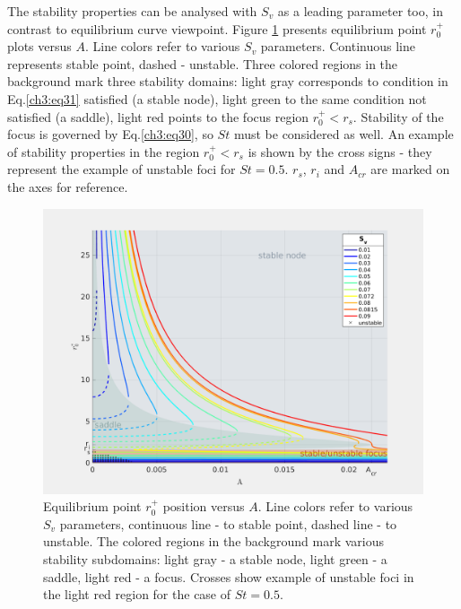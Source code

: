 \documentclass[../main.tex]{subfiles}
\begin{document}
The stability properties can be analysed with $S_v$ as a leading parameter too, in contrast to equilibrium curve viewpoint. Figure \ref{fig:ch3_8} presents equilibrium point $r^+_0$ plots versus $A$. Line colors refer to various $S_v$ parameters. Continuous line represents stable point, dashed - unstable. Three colored regions in the background mark three stability domains: light gray corresponds to condition in Eq.\ref{ch3:eq31} satisfied (a stable node), light green to the same condition not satisfied (a saddle), light red points to the focus region $r^+_0<r_s$. Stability of the focus is governed by Eq.\ref{ch3:eq30}, so $St$ must be considered as well. An example of stability properties in the region $r^+_0<r_s$ is shown by the cross signs - they represent the example of unstable foci for $St=0.5$. $r_s$, $r_i$ and $A_{cr}$ are marked on the axes for reference.

\begin{figure}
\centering
\noindent \includegraphics[width=30pc]{gfx/r0_vs_A_plus_stability.png}
\caption{Equilibrium point $r^+_0$ position versus $A$. Line colors refer to various $S_v$ parameters, continuous line - to stable point, dashed line - to unstable. The colored regions in the background mark various stability subdomains: light gray - a stable node, light green - a saddle, light red - a focus. Crosses show example of unstable foci in the light red region for the case of $St=0.5$.}
\label{fig:ch3_8}
\end{figure}
\end{document}
